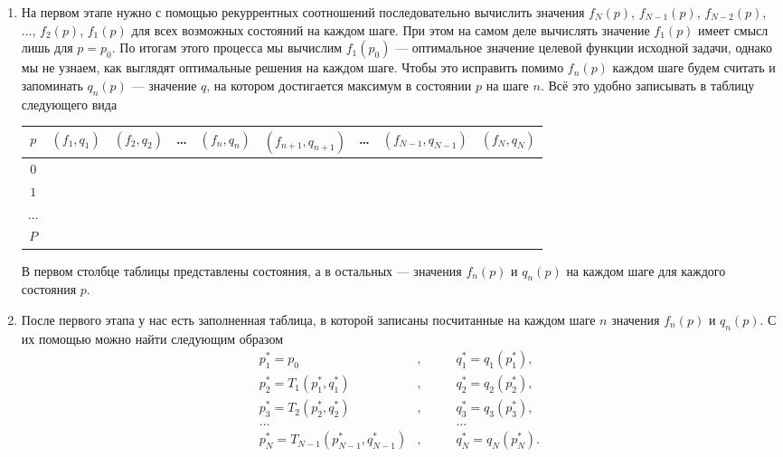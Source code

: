 \begin{enumerate}[nosep]
	\item[\fbox{Этап 1}] На первом этапе нужно с помощью рекуррентных соотношений последовательно вычислить значения $f_N(p)$, $f_{N-1}(p)$, $f_{N-2}(p)$, $\dots$, $f_2(p)$, $f_1(p)$ для всех возможных состояний на каждом шаге. При этом на самом деле вычислять значение $f_1(p)$ имеет смысл лишь для $p = p_0$. По итогам этого процесса мы вычислим $f_1(p_0)$ --- оптимальное значение целевой функции исходной задачи, однако мы не узнаем, как выглядят оптимальные решения на каждом шаге. Чтобы это исправить помимо $f_n(p)$ каждом шаге будем считать и запоминать $q_n(p)$ --- значение $q$, на котором достигается максимум в состоянии $p$ на шаге $n$. Всё это удобно записывать в таблицу следующего вида
	
	\begin{table}[H]
		\centering
		\begin{tabular}{ | c | c | c | c | c | c | c | c | c | } 
			\hline
			$p$ & $(f_1, q_1)$ & $(f_2, q_2)$ & \dots & $(f_n, q_n)$ & $(f_{n+1}, q_{n+1})$ & \dots & $(f_{N-1}, q_{N-1})$ & $(f_N, q_N)$ \\ 
			\hline
			$0$ & & & & & & & & \\\hline
			$1$ & & & & & & & & \\\hline
			$\dots$ & & & & & & & & \\\hline
			$P$ & & & & & & & & \\\hline
		\end{tabular}
	\end{table}
	
	В первом столбце таблицы представлены состояния, а в остальных --- значения $f_n(p)$ и $q_n(p)$ на каждом шаге для каждого состояния $p$.
	
	\item[\fbox{Этап 2}] После первого этапа у нас есть заполненная таблица, в которой записаны посчитанные на каждом шаге $n$ значения $f_n(p)$ и $q_n(p)$. С их помощью можно найти \underline{} следующим образом
	\begin{align*}
		p_1^* = p_0&, \qquad &q_1^* = q_1(p_1^*), \\
		p_2^* = T_1(p_1^*, q_1^*)&, &q_2^* = q_2(p_2^*), \\
		p_3^* = T_2(p_2^*, q_2^*)&, &q_3^* = q_3(p_3^*), \\
		\dots& &\dots \\
		p_N^* = T_{N-1}(p_{N-1}^*, q_{N-1}^*)&, &q_N^* = q_N(p_N^*).
	\end{align*}
\end{enumerate}

